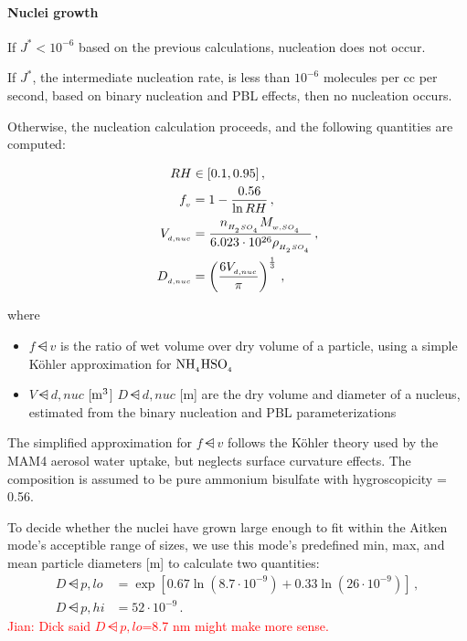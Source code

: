 \paragraph{Nuclei growth} 

If $J^* < 10^{-6}$ based on the previous calculations, nucleation does not
occur.

\begin{assume}
  If $J^*$, the intermediate nucleation rate, is less than $10^{-6}$ molecules
  per cc per second, based on binary nucleation and PBL effects, then no
  nucleation occurs.
\end{assume}

Otherwise, the nucleation calculation proceeds, and the following quantities are
computed:

\begin{align}
  RH &\in [0.1, 0.95] \,, \\
  f_{_{v}} &= 1 - \frac{0.56}{\ln RH} \,, \\
  V_{_{d,nuc}} &= \frac{n_{_{H_{_2}SO_{_4}}} M_{_{w,SO_{_4}}}}
                   {6.023 \cdot 10^{26} \rho_{_{H_{_2}SO_{_4}}}} \,, \\
  D_{_{d,nuc}} &= \left( \frac{6 V_{_{d,nuc}}}{\pi} \right)^{\frac{1}{3}} \,,
\end{align}

where

\begin{itemize}
  \item $f\dsub{v}$ is the ratio of wet volume over dry volume of a particle,
        using a simple K\"ohler approximation for $\rm NH_{_{4}}HSO_{_{4}}$
  \item $V\dsub{d,nuc}$ [$\rm m^3$] $D\dsub{d,nuc}$ [m] are the dry volume and
        diameter of a nucleus, estimated from the binary nucleation and PBL
        parameterizations
\end{itemize}

The simplified approximation for $f\dsub{v}$ follows the K\"ohler theory used by
the MAM4 aerosol water uptake, but neglects surface curvature effects. The
composition is assumed to be pure ammonium bisulfate with hygroscopicity = 0.56.

To decide whether the nuclei have grown large enough to fit within the Aitken
mode's acceptible range of sizes, we use this mode's predefined min, max, and
mean particle diameters [m] to calculate two quantities:
\begin{align}
  D\dsub{p,lo} &= \exp \left[ 0.67 \ln (8.7 \cdot 10^{-9}) +
                            0.33 \ln (26 \cdot 10^{-9}) \right] \,, \\   %
  D\dsub{p,hi} &= 52 \cdot 10^{-9} \,.
\end{align}
\textcolor{red}{Jian: Dick said $D\dsub{p,lo}$=8.7 nm might make more sense.}

